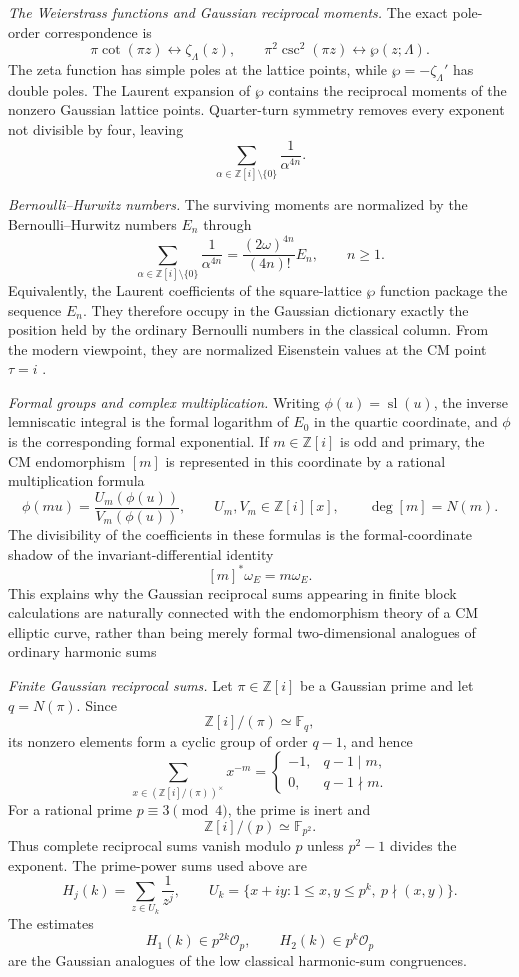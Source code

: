 \documentclass[a4paper,american,11pt]{amsart}
\numberwithin{equation}{section}
\theoremstyle{definition}
\newcommand{\Z}{\mathbb Z}
\newcommand{\F}{\mathbb F}
\newcommand{\Op}{\mathcal O_p}
\DeclareMathOperator{\slf}{sl}
\begin{document}
\emph{The Weierstrass functions and Gaussian reciprocal moments.}
The exact pole-order correspondence is
\[
\pi\cot(\pi z)\longleftrightarrow\zeta_\Lambda(z),
\qquad
\pi^2\csc^2(\pi z)\longleftrightarrow\wp(z;\Lambda).
\]
The zeta function has simple poles at the lattice points, while $\wp=-\zeta_\Lambda'$ has double poles. The Laurent expansion of $\wp$ contains the reciprocal moments of the nonzero Gaussian lattice points. Quarter-turn symmetry removes every exponent not divisible by four, leaving
\[
\sum_{\alpha\in\Z[i]\setminus\{0\}}\frac1{\alpha^{4n}}.
\]

\emph{Bernoulli--Hurwitz numbers.}
The surviving moments are normalized by the Bernoulli--Hurwitz numbers $E_n$ through
\[
\sum_{\alpha\in\Z[i]\setminus\{0\}}
\frac1{\alpha^{4n}}
=
\frac{(2\omega)^{4n}}{(4n)!}E_n,
\qquad n\geq1.
\]
Equivalently, the Laurent coefficients of the square-lattice $\wp$ function package the sequence $E_n$. They therefore occupy in the Gaussian dictionary exactly the position held by the ordinary Bernoulli numbers in the classical column. From the modern viewpoint, they are normalized Eisenstein values at the CM point $\tau=i$ .

\emph{Formal groups and complex multiplication.}
Writing $\phi(u)=\slf(u)$, the inverse lemniscatic integral is the formal logarithm of $E_0$ in the quartic coordinate, and $\phi$ is the corresponding formal exponential. If $m\in\Z[i]$ is odd and primary, the CM endomorphism $[m]$ is represented in this coordinate by a rational multiplication formula
\[
\phi(mu)=\frac{U_m(\phi(u))}{V_m(\phi(u))},
\qquad
U_m,V_m\in\Z[i][x],
\qquad
\deg[m]=N(m).
\]
The divisibility of the coefficients in these formulas is the formal-coordinate shadow of the invariant-differential identity
\[
[m]^*\omega_E=m\omega_E.
\]
This explains why the Gaussian reciprocal sums appearing in finite block calculations are naturally connected with the endomorphism theory of a CM elliptic curve, rather than being merely formal two-dimensional analogues of ordinary harmonic sums 

\emph{Finite Gaussian reciprocal sums.}
Let $\pi\in\Z[i]$ be a Gaussian prime and let $q=N(\pi)$. Since
\[
\Z[i]/(\pi)\simeq\F_q,
\]
its nonzero elements form a cyclic group of order $q-1$, and hence
\[
\sum_{x\in(\Z[i]/(\pi))^\times}x^{-m}
=
\begin{cases}
-1,&q-1\mid m,\\
0,&q-1\nmid m.
\end{cases}
\]
For a rational prime $p\equiv3\pmod4$, the prime is inert and
\[
\Z[i]/(p)\simeq\F_{p^2}.
\]
Thus complete reciprocal sums vanish modulo $p$ unless $p^2-1$ divides the exponent. The prime-power sums used above are
\[
H_j(k)=\sum_{z\in U_k}\frac1{z^j},
\qquad
U_k=\{x+iy:1\leq x,y\leq p^k,\ p\nmid(x,y)\}.
\]
The estimates
\[
H_1(k)\in p^{2k}\Op,
\qquad
H_2(k)\in p^k\Op
\]
are the Gaussian analogues of the low classical harmonic-sum congruences.
\end{document}
